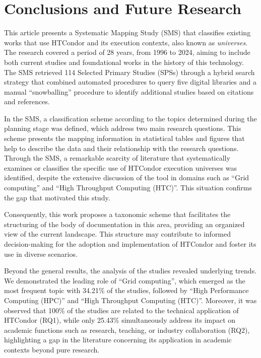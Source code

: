 \section{Conclusions and Future Research}\label{sec:conclusiones}

This article presents a Systematic Mapping Study (SMS) that classifies existing works that use HTCondor and its execution contexts, also known as \textit{universes}. The research covered a period of 28 years, from 1996 to 2024, aiming to include both current studies and foundational works in the history of this technology. The SMS retrieved 114 Selected Primary Studies (SPSs) through a hybrid search strategy that combined automated procedures to query five digital libraries and a manual ``snowballing'' procedure to identify additional studies based on citations and references.

In the SMS, a classification scheme according to the topics determined during the planning stage was defined, which address two main research questions. This scheme presents the mapping information in statistical tables and figures that help to describe the data and their relationship with the research questions. Through the SMS, a remarkable scarcity of literature that systematically examines or classifies the specific use of HTCondor execution universes was identified, despite the extensive discussion of the tool in domains such as ``Grid computing'' and ``High Throughput Computing (HTC)''. This situation confirms the gap that motivated this study.

Consequently, this work proposes a taxonomic scheme that facilitates the structuring of the body of documentation in this area, providing an organized view of the current landscape. This structure may contribute to informed decision-making for the adoption and implementation of HTCondor and foster its use in diverse scenarios.

Beyond the general results, the analysis of the studies revealed underlying trends. We demonstrated the leading role of ``Grid computing'', which emerged as the most frequent topic with 34.21\% of the studies, followed by ``High Performance Computing (HPC)'' and ``High Throughput Computing (HTC)''. Moreover, it was observed that 100\% of the studies are related to the technical application of HTCondor (RQ1), while only 25.43\% simultaneously address its impact on academic functions such as research, teaching, or industry collaboration (RQ2), highlighting a gap in the literature concerning its application in academic contexts beyond pure research.

